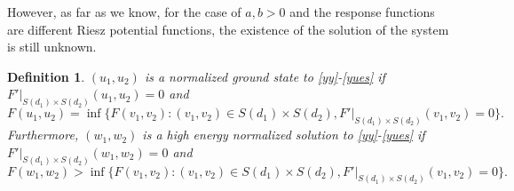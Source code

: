 \documentclass[10pt,a4paper]{amsart}
\numberwithin{equation}{section}
\newtheorem{definition}[theo]{Definition}
\begin{document}
However, as far as we know, for the case of $a,b>0$ and the response functions are
different Riesz potential functions,
the existence of the solution of the system is still unknown.

\begin{definition}\label{df82} \rm
 $(u_1,u_2)$ is a \emph{normalized ground state} to \eqref{yy}-\eqref{yues}
if $F'|_{S(d_1)\times S(d_2)}(u_1,u_2)=0$ and
\[
 F(u_1,u_2)=\inf\{F(v_1,v_2): (v_1,v_2)\in S(d_1)\times S(d_2),
  F'|_{S(d_1)\times S(d_2)}(v_1,v_2)=0\}.
\]
Furthermore, $(w_1,w_2)$ is a \emph{high energy normalized solution}
to \eqref{yy}-\eqref{yues} if $F'|_{S(d_1)\times S(d_2)}(w_1,w_2)=0$ and
\[
 F(w_1,w_2)>\inf\{F(v_1,v_2): (v_1,v_2)\in S(d_1)\times S(d_2),
 F'|_{S(d_1)\times S(d_2)}(v_1,v_2)=0\}.
\]
\end{definition}
\end{document}
